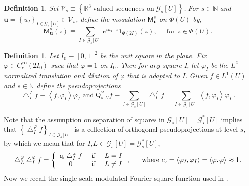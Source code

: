 \documentclass{amsart}%
\theoremstyle{plain}
\newtheorem{definition}[theorem]{Definition}
\numberwithin{equation}{section}
\begin{document}
\begin{definition}
\label{def M}Set $\mathcal{V}_{s}\equiv\left\{  \mathbb{R}^{3}\text{-valued
sequences on }\mathcal{G}_{s}\left[  U\right]  \right\}  $. For $s\in
\mathbb{N} $ and $\mathbf{u}=\left\{  u_{I}\right\}  _{I\in\mathcal{G}%
_{s}\left[  U\right]  }\in\mathcal{V}_{s}$, define the modulation
$\mathsf{M}_{\mathbf{u}}^{s}$ on $\Phi\left(  U\right)  $ by,%
\[
\mathsf{M}_{\mathbf{u}}^{s}\left(  z\right)  \equiv\sum_{I\in\mathcal{G}%
_{s}\left[  U\right]  }e^{iu_{I}\cdot z}\mathbf{1}_{\Phi\left(  2I\right)
}\left(  z\right)  ,\ \ \ \ \ \text{\ for }z\in\Phi\left(  U\right)  .
\]

\end{definition}

\begin{definition}
\label{def Q}Let $I_{0}\equiv\left[  0,1\right]  ^{2}$ be the unit square in
the plane. Fix $\varphi\in C_{c}^{\infty}\left(  2I_{0}\right)  $ such that
$\varphi=1$ on $I_{0}$. Then for any square $I$, let $\varphi_{I}$ be the
$L^{2}$ normalized translation and dilation of $\varphi$ that is adapted to
$I$. Given $f\in L^{1}\left(  U\right)  $ and $s\in\mathbb{N}$ define the
pseudoprojections
\[
\bigtriangleup_{I}^{\varphi}f\equiv\left\langle f,\varphi_{I}\right\rangle
\varphi_{I}\text{ and }\mathsf{Q}_{s,U}^{\varphi}f\equiv\sum_{I\in
\mathcal{G}_{s}\left[  U\right]  }\bigtriangleup_{I}^{\varphi}f=\sum
_{I\in\mathcal{G}_{s}\left[  U\right]  }\left\langle f,\varphi_{I}%
\right\rangle \varphi_{I}\ .
\]

\end{definition}

Note that the assumption on separation of squares in $\mathcal{G}_{s}\left[
U\right]  =\mathcal{G}_{s}^{\ast}\left[  U\right]  $ implies that $\left\{
\bigtriangleup_{I}^{\varphi}f\right\}  _{I\in\mathcal{G}_{s}\left[  U\right]
}$ is a collection of orthogonal pseudoprojections at level $s$, by which we
mean that for $I,L\in\mathcal{G}_{s}\left[  U\right]  =\mathcal{G}_{s}^{\ast
}\left[  U\right]  $,%
\begin{equation}
\bigtriangleup_{L}^{\varphi}\bigtriangleup_{I}^{\varphi}f=\left\{
\begin{array}
[c]{ccc}%
c_{\flat}\bigtriangleup_{I}^{\varphi}f & \text{ if } & L=I\\
0 & \text{ if } & L\not =I
\end{array}
\right.  ,\ \ \ \ \ \text{where }c_{\flat}=\left\langle \varphi_{I}%
,\varphi_{I}\right\rangle =\left\langle \varphi,\varphi\right\rangle
\approx1.\label{pseudo}%
\end{equation}
Now we recall the single scale modulated Fourier square function used in
\cite{RiSa2}.
\end{document}

